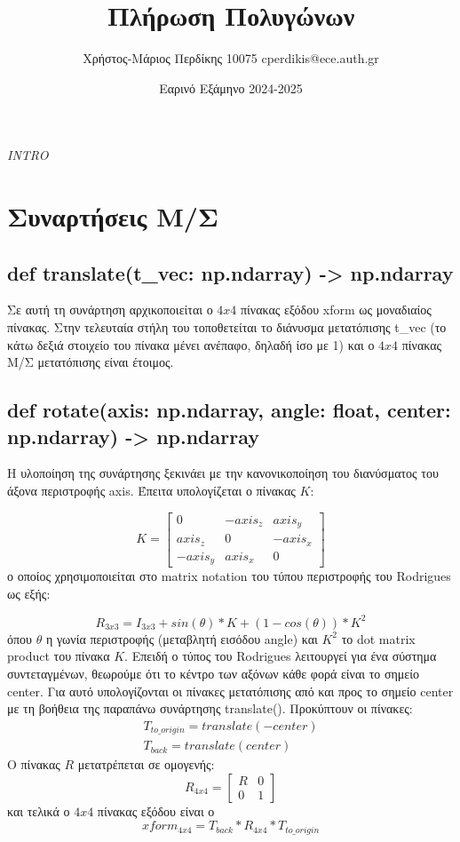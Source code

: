 \documentclass{article}
\title{Πλήρωση Πολυγώνων}
\date{Εαρινό Εξάμηνο 2024-2025}
\author{Χρήστος-Μάριος Περδίκης 10075 cperdikis@ece.auth.gr}
\begin{document}
\maketitle
\emph{INTRO}

\section{Συναρτήσεις Μ/Σ}
\subsection{def translate(t\_vec: np.ndarray) -> np.ndarray}
Σε αυτή τη συνάρτηση αρχικοποιείται ο $4x4$ πίνακας εξόδου xform ως
μοναδιαίος πίνακας. Στην τελευταία στήλη του τοποθετείται το διάνυσμα 
μετατόπισης t\_vec (το κάτω δεξιά στοιχείο του πίνακα μένει ανέπαφο, 
δηλαδή ίσο με 1) και ο $4x4$ πίνακας Μ/Σ μετατόπισης είναι έτοιμος.
\subsection{def rotate(axis: np.ndarray, angle: float, center: np.ndarray) -> np.ndarray}
Η υλοποίηση της συνάρτησης ξεκινάει με την κανονικοποίηση του διανύσματος 
του άξονα περιστροφής axis. Έπειτα υπολογίζεται ο πίνακας $Κ$:

\begin{equation}
    K = \left[\begin{matrix}
        0 & -axis_z & axis_y \\
        axis_z & 0 & -axis_x \\
        -axis_y & axis_x & 0
    \end{matrix}\right]
\end{equation}
ο οποίος χρησιμοποιείται στο matrix notation του τύπου περιστροφής του
Rodrigues ως εξής:

\begin{equation}
    R_{3x3} = I_{3x3} + sin(\theta) * K + (1-cos(\theta)) * K^2
\end{equation}
όπου $\theta$ η γωνία περιστροφής (μεταβλητή εισόδου angle) και $K^2$ το dot 
matrix product του πίνακα $K$. Επειδή ο τύπος του Rodrigues λειτουργεί για
ένα σύστημα συντεταγμένων, θεωρούμε ότι το κέντρο των αξόνων κάθε φορά
είναι το σημείο center. Για αυτό υπολογίζονται οι πίνακες μετατόπισης 
από και προς το σημείο center με τη βοήθεια της παραπάνω συνάρτησης 
translate(). Προκύπτουν οι πίνακες:
\begin{gather*}
    T_{to\_origin} = translate(-center) \\
    T_{back} = translate(center)
\end{gather*}
Ο πίνακας $R$ μετατρέπεται σε ομογενής:
\begin{equation}
    R_{4x4} = \left[\begin{matrix}
        R & 0 \\
        0 & 1
    \end{matrix}\right]
\end{equation}
και τελικά ο  $4x4$ πίνακας εξόδου είναι ο 
\begin{equation}
    xform_{4x4} = T_{back} * R_{4x4} * T_{to\_origin}
\end{equation}
\end{document}
